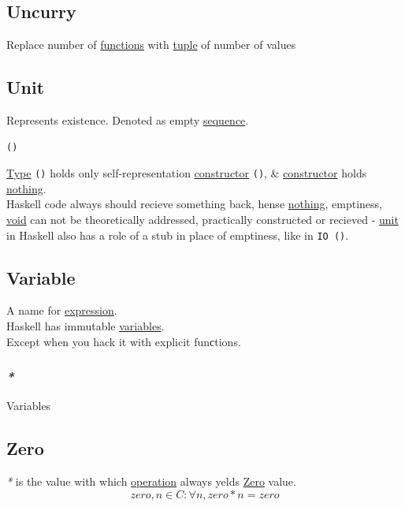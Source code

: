 \documentclass[11pt]{article}
\begin{document}
\subsection{\label{orgba1a4b9}Uncurry}
\label{sec:orgc8165ad}
Replace number of \hyperref[orgaa8fb87]{functions} with \hyperref[orgdf7eddf]{tuple} of number of values\\

\subsection{\label{org0b3ee46}Unit}
\label{sec:org49b6ca6}
Represents existence. Denoted as empty \hyperref[org522d1b0]{sequence}.\\
\begin{verbatim}
()
\end{verbatim}

\hyperref[orgc4aea2f]{Type} \texttt{()} holds only self-representation \hyperref[orgf4d811d]{constructor} \texttt{()}, \& \hyperref[orgf4d811d]{constructor} holds \hyperref[org35c2c9d]{nothing}.\\

Haskell code always should recieve something back, hense \hyperref[org35c2c9d]{nothing}, emptiness, \hyperref[org2fad40d]{void} can not be theoretically addressed, practically constructed or recieved - \hyperref[org0b3ee46]{unit} in Haskell also has a role of a stub in place of emptiness, like in \texttt{IO ()}.\\

\subsection{\label{org0b57594}Variable}
\label{sec:orgacc52f0}
A name for \hyperref[org9021dd7]{expression}.\\

Haskell has immutable \hyperref[orge17f54f]{variables}.\\
Except when you hack it with explicit funсtions.\\

\subsubsection{\emph{*}}
\label{sec:orgc1db389}

\label{orge17f54f}Variables\\

\subsection{\label{org5d1963a}Zero}
\label{sec:orgcae8c08}
\emph{*} is the value with which \hyperref[org1173fe8]{operation} always yelds \hyperref[org5d1963a]{Zero} value.\\
$$ zero, n \in C : \forall n, zero*n=zero $$\\
\end{document}
